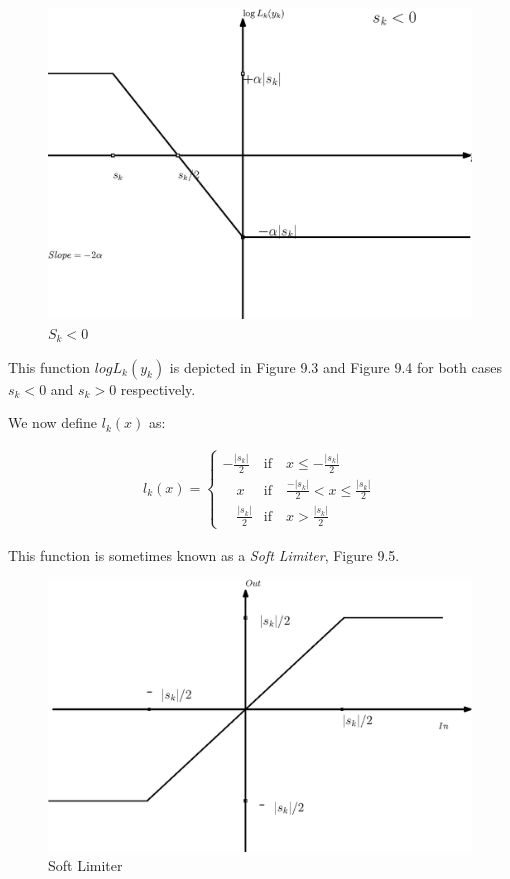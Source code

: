 \documentclass[12pt]{report}
\begin{document}
\begin{exmp}
		\begin{figure}[h]
			\centering
			\includegraphics[scale=0.6]{Figures/Sk_lessthanzero.eps}
			\caption{$S_k<0$}
			\label{fig:Sk_lessthanzero}
		\end{figure}
		
		This function $log L_k(y_k)$ is depicted in Figure 9.3 and Figure 9.4 for both cases $ s_k<0$ and $s_k>0$ respectively.
		
		We now define $l_k(x)$ as:
		
		\begin{align*}
		l_k(x)=
		\begin{cases}
		- \frac{|s_k|}{2} &\text{if} \quad x \leq - \frac{|s_k|}{2}\\
		\quad x &\text{if} \quad \frac{-|s_k|}{2} < x \leq \frac{|s_k|}{2}\\
		\quad\frac{|s_k|}{2} &\text{if} \quad x > \frac{|s_k|}{2}
		\end{cases}
		\end{align*}
		
		This function is sometimes known as a \textit{Soft Limiter}, Figure 9.5.
		
		\begin{figure}[h]
			\centering
			\includegraphics[scale=0.6]{Figures/SoftLimiter.eps}
			\caption{Soft Limiter}
			\label{fig:SoftLimiter}
		\end{figure}
		

\end{exmp}
\end{document}
